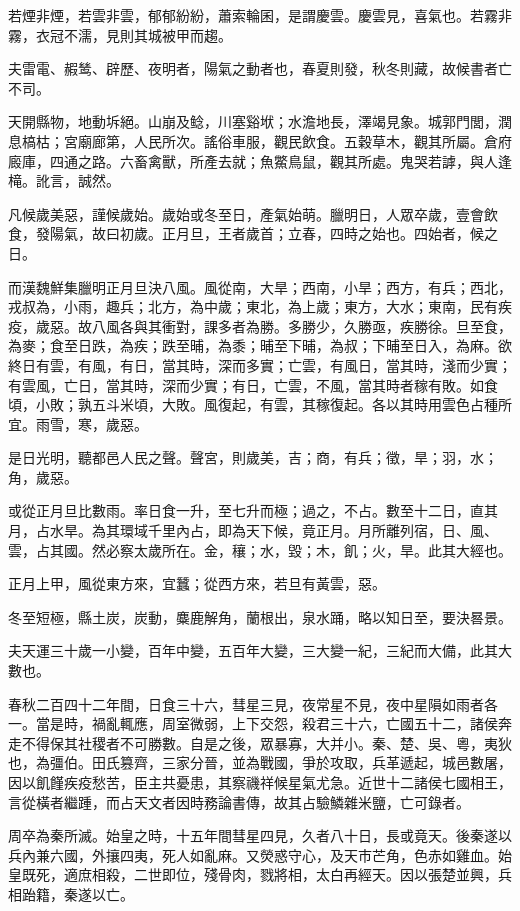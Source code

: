 \begin{pinyinscope}
若煙非煙，若雲非雲，郁郁紛紛，蕭索輪囷，是謂慶雲。慶雲見，喜氣也。若霧非霧，衣冠不濡，見則其城被甲而趨。

夫雷電、赮鸶、辟歷、夜明者，陽氣之動者也，春夏則發，秋冬則藏，故候書者亡不司。

天開縣物，地動坼絕。山崩及鲶，川塞谿垘；水澹地長，澤竭見象。城郭門閭，潤息槁枯；宮廟廊第，人民所次。謠俗車服，觀民飲食。五穀草木，觀其所屬。倉府廄庫，四通之路。六畜禽獸，所產去就；魚鱉鳥鼠，觀其所處。鬼哭若謼，與人逢槞。訛言，誠然。

凡候歲美惡，謹候歲始。歲始或冬至日，產氣始萌。臘明日，人眾卒歲，壹會飲食，發陽氣，故曰初歲。正月旦，王者歲首；立春，四時之始也。四始者，候之日。

而漢魏鮮集臘明正月旦決八風。風從南，大旱；西南，小旱；西方，有兵；西北，戎叔為，小雨，趣兵；北方，為中歲；東北，為上歲；東方，大水；東南，民有疾疫，歲惡。故八風各與其衝對，課多者為勝。多勝少，久勝亟，疾勝徐。旦至食，為麥；食至日跌，為疾；跌至晡，為黍；晡至下晡，為叔；下晡至日入，為麻。欲終日有雲，有風，有日，當其時，深而多實；亡雲，有風日，當其時，淺而少實；有雲風，亡日，當其時，深而少實；有日，亡雲，不風，當其時者稼有敗。如食頃，小敗；孰五斗米頃，大敗。風復起，有雲，其稼復起。各以其時用雲色占種所宜。雨雪，寒，歲惡。

是日光明，聽都邑人民之聲。聲宮，則歲美，吉；商，有兵；徵，旱；羽，水；角，歲惡。

或從正月旦比數雨。率日食一升，至七升而極；過之，不占。數至十二日，直其月，占水旱。為其環域千里內占，即為天下候，竟正月。月所離列宿，日、風、雲，占其國。然必察太歲所在。金，穰；水，毀；木，飢；火，旱。此其大經也。

正月上甲，風從東方來，宜蠶；從西方來，若旦有黃雲，惡。

冬至短極，縣土炭，炭動，麋鹿解角，蘭根出，泉水踊，略以知日至，要決晷景。

夫天運三十歲一小變，百年中變，五百年大變，三大變一紀，三紀而大備，此其大數也。

春秋二百四十二年間，日食三十六，彗星三見，夜常星不見，夜中星隕如雨者各一。當是時，禍亂輒應，周室微弱，上下交怨，殺君三十六，亡國五十二，諸侯奔走不得保其社稷者不可勝數。自是之後，眾暴寡，大并小。秦、楚、吳、粵，夷狄也，為彊伯。田氏篡齊，三家分晉，並為戰國，爭於攻取，兵革遞起，城邑數屠，因以飢饉疾疫愁苦，臣主共憂患，其察禨祥候星氣尤急。近世十二諸侯七國相王，言從橫者繼踵，而占天文者因時務論書傳，故其占驗鱗雜米鹽，亡可錄者。

周卒為秦所滅。始皇之時，十五年間彗星四見，久者八十日，長或竟天。後秦遂以兵內兼六國，外攘四夷，死人如亂麻。又熒惑守心，及天市芒角，色赤如雞血。始皇既死，適庶相殺，二世即位，殘骨肉，戮將相，太白再經天。因以張楚並興，兵相跆籍，秦遂以亡。


\end{pinyinscope}

